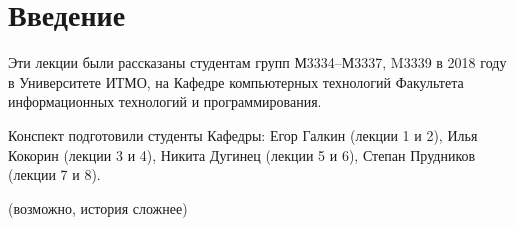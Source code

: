 \section{Введение}

Эти лекции были рассказаны студентам групп М3334--М3337, M3339
в 2018 году в Университете ИТМО, на Кафедре компьютерных технологий Факультета информационных технологий и программирования.

Конспект подготовили студенты Кафедры: Егор Галкин (лекции 1 и 2),
Илья Кокорин (лекции 3 и 4), Никита Дугинец (лекции 5 и 6), Степан Прудников (лекции 7 и 8).

(возможно, история сложнее)